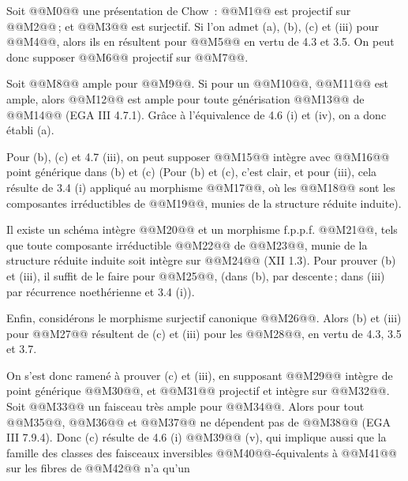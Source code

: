 
Soit @@M0@@ une pr\'esentation de Chow~: @@M1@@ est projectif sur @@M2@@\,; et @@M3@@ est surjectif. Si l'on admet (a), (b), (c) et (iii) pour @@M4@@, alors ils en r\'esultent pour @@M5@@ en vertu de 4.3 et 3.5. On peut donc supposer @@M6@@ projectif sur @@M7@@.

Soit @@M8@@ ample pour @@M9@@. Si pour un @@M10@@, @@M11@@ est ample, alors @@M12@@ est ample pour toute g\'en\'erisation @@M13@@ de @@M14@@ (EGA III 4.7.1). Gr\^ace \`a l'\'equivalence de 4.6 (i) et (iv), on a donc \'etabli (a).

Pour (b), (c) et 4.7 (iii), on peut supposer @@M15@@ int\`egre avec @@M16@@ point g\'en\'erique dans (b) et (c) (Pour (b) et (c), c'est clair, et pour (iii), cela r\'esulte de 3.4 (i) appliqu\'e au morphisme @@M17@@, o\`u les @@M18@@ sont les composantes irr\'eductibles de @@M19@@, munies de la structure r\'eduite induite).

Il existe un sch\'ema int\`egre @@M20@@ et un morphisme f.p.p.f. @@M21@@, tels que toute composante irr\'eductible @@M22@@ de @@M23@@, munie de la structure r\'eduite induite soit int\`egre sur @@M24@@ (XII 1.3). Pour prouver (b) et (iii), il suffit de le faire pour @@M25@@, (dans (b), par descente\,; dans (iii) par r\'ecurrence noeth\'erienne et 3.4 (i)).

Enfin, consid\'erons le morphisme surjectif canonique @@M26@@. Alors (b) et (iii) pour @@M27@@ r\'esultent de (c) et (iii) pour les @@M28@@, en vertu de 4.3, 3.5 et 3.7.

On s'est donc ramen\'e \`a prouver (c) et (iii), en supposant @@M29@@ int\`egre de point g\'en\'erique @@M30@@, et @@M31@@ projectif et int\`egre sur @@M32@@. Soit @@M33@@ un faisceau tr\`es ample pour @@M34@@. Alors pour tout @@M35@@, @@M36@@ et @@M37@@ ne d\'ependent pas de @@M38@@ (EGA III 7.9.4). Donc (c) r\'esulte de 4.6 (i) @@M39@@ (v), qui implique aussi que la famille des classes des faisceaux inversibles @@M40@@-\'equivalents \`a @@M41@@ sur les fibres de @@M42@@ n'a qu'un
